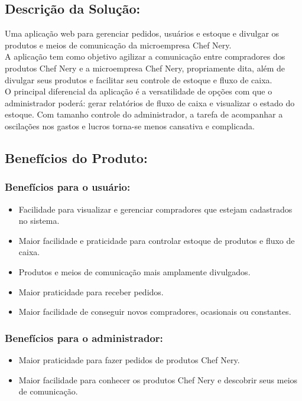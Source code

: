 \begin{apendicesenv}
\subsection{Descrição da Solução:}
Uma aplicação web para gerenciar pedidos, usuários e estoque e divulgar os produtos e meios de comunicação da microempresa Chef Nery. \\
\tab A aplicação tem como objetivo agilizar a comunicação entre compradores dos produtos Chef Nery e a microempresa Chef Nery, propriamente dita, além de divulgar seus produtos e facilitar seu controle de estoque e fluxo de caixa.\\
\tab O principal diferencial da aplicação é a  versatilidade de opções com que o administrador poderá: gerar relatórios de fluxo de caixa e visualizar o estado do estoque. Com tamanho controle do administrador, a tarefa de acompanhar a oscilações nos gastos e lucros torna-se menos cansativa e complicada.\\

\subsection{Benefícios do Produto:}
\subsubsection{Benefícios para o usuário:}
\begin{itemize}

\item Facilidade para visualizar e gerenciar compradores que estejam cadastrados no sistema. 
\item Maior facilidade e praticidade para controlar estoque de produtos e fluxo de caixa.
\item Produtos e meios de comunicação mais amplamente divulgados.
\item Maior praticidade para receber pedidos.
\item Maior facilidade de conseguir novos compradores, ocasionais ou constantes.

\end{itemize}

\subsubsection{Benefícios para o administrador:}
\begin{itemize}

\item Maior praticidade para fazer pedidos de produtos Chef Nery. 
\item Maior facilidade para conhecer os produtos Chef Nery e descobrir seus meios de comunicação.


\end{itemize}
\end{apendicesenv}
